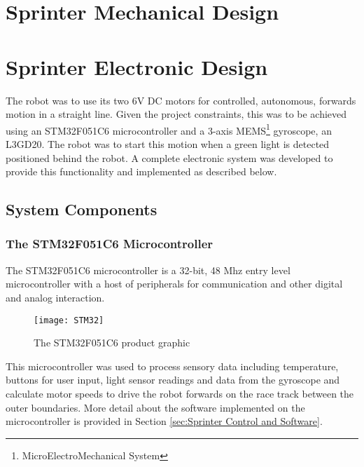 \section{Sprinter Mechanical Design}
\label{sec:Sprinter Mechanical Design}

\clearpage
\section{Sprinter Electronic Design}
\label{sec:Sprinter Electronic Design}
  The robot was to use its two 6V DC motors for controlled, autonomous, forwards motion in a straight line. Given the project constraints, this was to be achieved using an STM32F051C6 microcontroller and a 3-axis MEMS\footnote{MicroElectroMechanical System} gyroscope, an L3GD20. The robot was to start this motion when a green light is detected positioned behind the robot. A complete electronic system was developed to provide this functionality and implemented as described below.

  \subsection{System Components}
  \label{sub:System Components}
    \subsubsection{The STM32F051C6 Microcontroller}
    \label{subs:The STM32F051C6 Microcontroller}
      The STM32F051C6 microcontroller is a 32-bit, 48 Mhz entry level microcontroller\textsuperscript{\cite{stm32f051c6Datasheet}} with a host of peripherals for communication and other digital and analog interaction.

      \begin{figure}[H]
        \begin{center}
          \texttt{[image: STM32]}
          \caption{The STM32F051C6 product graphic}
          \label{fig:STM32}
        \end{center}
      \end{figure}

      This microcontroller was used to process sensory data including temperature, buttons for user input, light sensor readings and data from the gyroscope and calculate motor speeds to drive the robot forwards on the race track between the outer boundaries. More detail about the software implemented on the microcontroller is provided in Section \ref{sec:Sprinter Control and Software}.

